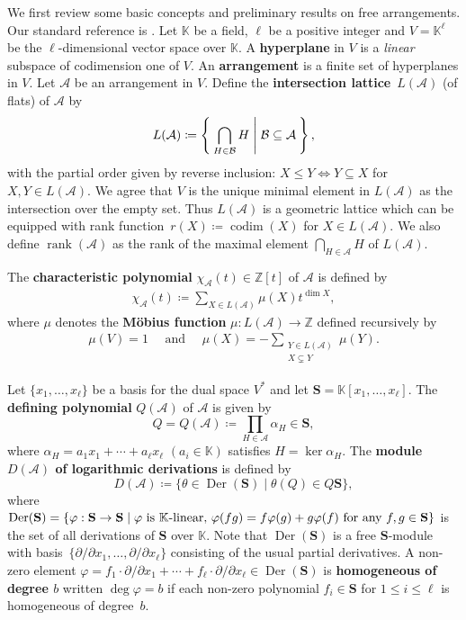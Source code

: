 \documentclass[ALCO, Unicode,published]{cedram}
\DeclareMathOperator{\rank}{rank}
\DeclareMathOperator{\Der}{Der}
\newcommand{\A}{\mathcal{A}}
\begin{document}
We first review some basic concepts and preliminary results on free arrangements. Our standard reference is \cite{OT92}.
Let $\mathbb{K}$ be a field, $\ell$ be a positive integer and $V = \mathbb{K}^\ell$ be the  $ \ell $-dimensional vector space over $ \mathbb{K} $. 
A \textbf{hyperplane} in $V$ is a  \textit{linear} subspace of codimension one of $V$.
An \textbf{arrangement} is a finite set of hyperplanes in $V$. 
Let $\A$ be an arrangement in $V$. 
Define the \textbf{intersection lattice}~$ L(\mathcal{A}) $ (of flats) of $ \mathcal{A} $ by 
\begin{align*}
L(\mathcal{A}) \coloneqq \Set{\bigcap_{H \in \mathcal{B}}H  |  \mathcal{B} \subseteq \mathcal{A} },
\end{align*}
with the partial order given by reverse inclusion: $X\le Y\Leftrightarrow Y\subseteq X$ for $X, Y \in L(\A)$. 
We agree that $V $ is the unique minimal element in $ L(\mathcal{A}) $ as the intersection over the empty set. 
Thus $ L(\mathcal{A}) $ is a geometric lattice which can be equipped with rank function~$ r(X) \coloneqq \operatorname{codim}(X) $ for $X \in L(\mathcal{A})$. 
We also define $\rank(\A)$ as the rank of the maximal element $\bigcap_{H \in \mathcal{A}}H$ of $L(\A)$.

The \textbf{characteristic polynomial} $ \chi_{\mathcal{A}}(t) \in \mathbb{Z}[t] $ of $ \mathcal{A} $ is defined by
\begin{align*}
\chi_{\mathcal{A}}(t) \coloneqq \sum_{X \in L(\mathcal{A})}\mu(X)t^{\dim X}, 
\end{align*}
where $ \mu $ denotes the \textbf{M\"{o}bius function} $ \mu \colon L(\mathcal{A}) \to \mathbb{Z} $ defined recursively by 
\begin{align*}
\mu\left( V\right)= 1 
\quad \text{ and } \quad 
\mu(X) = -\sum_{\substack{Y \in L(\mathcal{A}) \\ X \subsetneq Y}}\mu(Y). 
\end{align*}

Let $ \{x_{1}, \dots, x_{\ell}\} $ be a basis for the dual space $V^{\ast} $ and let $ \textbf{S}=\mathbb{K}[x_{1}, \dots, x_{\ell}] $. 
The \textbf{defining polynomial} $Q(\A)$ of $\A$ is given by
$$Q=Q(\A)\coloneqq \prod_{H \in \A} \alpha_H \in  \textbf{S},$$
where $ \alpha_H=a_1x_1+\cdots+a_\ell x_\ell$  $(a_i\in \mathbb{K})$ satisfies $H = \ker \alpha_H$. 
The \textbf{module $D(\mathcal{A}) $ of logarithmic derivations}  is defined by 
$$D(\A)\coloneqq  \{ \theta\in \Der(\textbf{S}) \mid \theta(Q) \in Q \textbf{S}\},$$
where $ \Der( \textbf{S}) = \{ \varphi: \textbf{S}\to  \textbf{S} \mid \mbox{$\varphi$ is $ \mathbb{K}$-linear,
$\varphi(fg)=f\varphi(g)+g\varphi(f)$ for any $f,g \in  \textbf{S}$}\}$ is the set of all derivations of $ \textbf{S} $ over $\mathbb{K}$. 
Note that $\Der( \textbf{S})$ is a free $ \textbf{S}$-module with basis~$\{\partial/\partial x_1,\ldots , \partial/\partial x_\ell\}$ consisting of the usual partial derivatives. 
A non-zero element $\varphi= f_1\cdot\partial/\partial x_1+\cdots+f_\ell\cdot\partial/\partial x_\ell\in  \Der( \textbf{S})$ is \textbf{homogeneous of degree $b$} written  $\deg\varphi=b$ if each non-zero polynomial $f_i\in  \textbf{S}$ for $1 \le i \le \ell$ is homogeneous of degree~$b$. 
\end{document}
